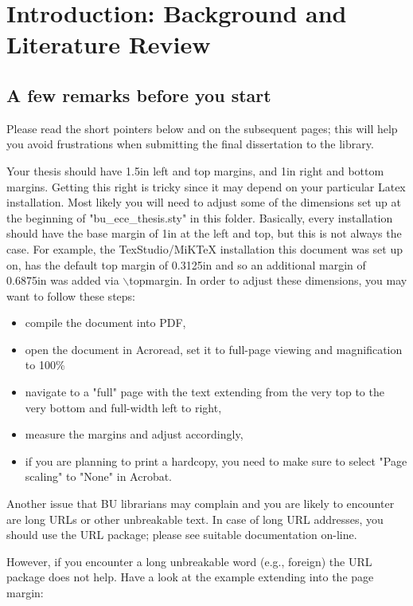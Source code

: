 \chapter{
  Introduction: Background and Literature Review} \label{chapter:Introduction} \thispagestyle{myheadings} 

\section{A few remarks before you start} \label{sec:history} 

Please read the short pointers below and on the subsequent pages;
this will help
you avoid frustrations when submitting the final dissertation to the library.

Your thesis should have 1.5in left and top margins, and 1in right and bottom margins.
Getting this right is tricky since it may depend on your particular Latex installation.
Most likely you will need to adjust some of the dimensions set up at the beginning of "bu\_ece\_thesis.sty" in this folder.
Basically, every installation should have the base margin of 1in at the left and top, but this is not always the case.
For example, the TexStudio/MiKTeX installation this document was set up on, has the default top margin of 0.3125in and so an additional margin of 0.6875in was added via $\backslash${topmargin}.
In order to adjust these dimensions, you may want to follow these steps: 

\begin{itemize}
	\item compile the document into PDF,
	\item open the document in Acroread, set it to full-page viewing and magnification to 100\%
	\item navigate to a "full" page with the text extending from the very top to the very bottom and full-width left to right,
	\item measure the margins and adjust accordingly,
	\item if you are planning to print a hardcopy, you need to make sure to select "Page scaling" to "None" in Acrobat.
\end{itemize}

Another issue that BU librarians may complain and you are likely to encounter are long URLs or other unbreakable text.
In case of long URL addresses, you should use the URL package;
please see suitable documentation on-line.

However, if you encounter a long unbreakable word (e.g., foreign) the URL package does not help.
Have a look at the example extending into the page margin: 

